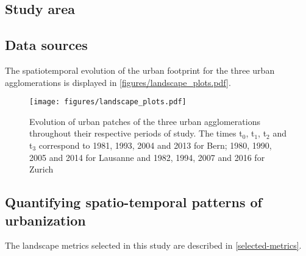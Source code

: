 \documentclass[10pt,letterpaper]{article}
\begin{document}
\subsection*{Study area}

\subsection*{Data sources}

The spatiotemporal evolution of the urban footprint for the three urban agglomerations is displayed in \autoref{figures/landscape_plots.pdf}.

\begin{figure}[!ht]
  \begin{adjustwidth}{-.4\textwidth}{0cm}
    \centering  
    \texttt{[image: figures/landscape\_plots.pdf]}
    \vspace{.5em}
    \caption[Evolution of urban patches]{\label{figures/landscape_plots.pdf}Evolution of urban patches of the three urban agglomerations throughout their respective periods of study. The times t$_0$, t$_1$, t$_2$ and t$_3$ correspond to 1981, 1993, 2004 and 2013 for Bern; 1980, 1990, 2005 and 2014 for Lausanne and 1982, 1994, 2007 and 2016 for Zurich}
  \end{adjustwidth}
\end{figure}

\subsection*{Quantifying spatio-temporal patterns of urbanization}

The landscape metrics selected in this study are described in \autoref{selected-metrics}.
\end{document}
